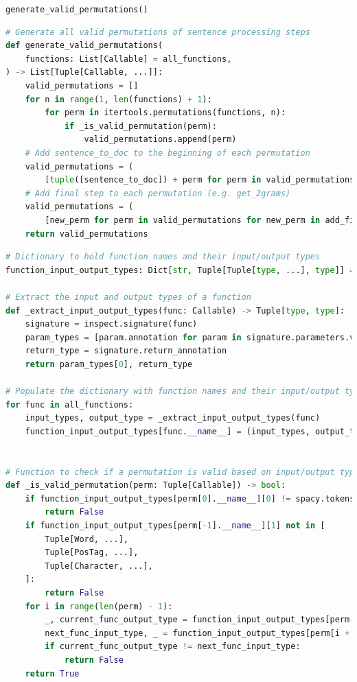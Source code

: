 \documentclass{beamer}
\begin{document}
\begin{frame}[fragile]{\texttt{generate\_valid\_permutations()}}
    \begin{lstlisting}[language=Python]
# Generate all valid permutations of sentence processing steps
def generate_valid_permutations(
    functions: List[Callable] = all_functions,
) -> List[Tuple[Callable, ...]]:
    valid_permutations = []
    for n in range(1, len(functions) + 1):
        for perm in itertools.permutations(functions, n):
            if _is_valid_permutation(perm):
                valid_permutations.append(perm)
    # Add sentence_to_doc to the beginning of each permutation
    valid_permutations = (
        [tuple([sentence_to_doc]) + perm for perm in valid_permutations])
    # Add final step to each permutation (e.g. get_2grams)
    valid_permutations = (
        [new_perm for perm in valid_permutations for new_perm in add_final_step(perm)])
    return valid_permutations

    \end{lstlisting}
\end{frame}

\begin{frame}[fragile]{}
    \begin{lstlisting}[language=Python]
# Dictionary to hold function names and their input/output types
function_input_output_types: Dict[str, Tuple[Tuple[type, ...], type]] = {}

# Extract the input and output types of a function
def _extract_input_output_types(func: Callable) -> Tuple[type, type]:
    signature = inspect.signature(func)
    param_types = [param.annotation for param in signature.parameters.values()]
    return_type = signature.return_annotation
    return param_types[0], return_type

# Populate the dictionary with function names and their input/output types
for func in all_functions:
    input_types, output_type = _extract_input_output_types(func)
    function_input_output_types[func.__name__] = (input_types, output_type)


# Function to check if a permutation is valid based on input/output types
def _is_valid_permutation(perm: Tuple[Callable]) -> bool:
    if function_input_output_types[perm[0].__name__][0] != spacy.tokens.doc.Doc:
        return False
    if function_input_output_types[perm[-1].__name__][1] not in [
        Tuple[Word, ...],
        Tuple[PosTag, ...],
        Tuple[Character, ...],
    ]:
        return False
    for i in range(len(perm) - 1):
        _, current_func_output_type = function_input_output_types[perm[i].__name__]
        next_func_input_type, _ = function_input_output_types[perm[i + 1].__name__]
        if current_func_output_type != next_func_input_type:
            return False
    return True
    \end{lstlisting}
\end{frame}
\end{document}
